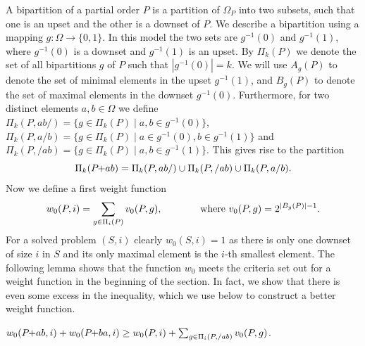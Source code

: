 \documentclass[a4paper,UKenglish,cleveref, autoref, thm-restate]{lipics-v2021}
\newcommand{\pchild}[3]{{#1}\kern-1pt{+}{#2}{#3}}
\begin{document}
A bipartition of a partial order $P$ is a partition of $\Omega_P$ into two subsets, such that one is an upset and the other is a downset of $P$.
We describe a bipartition using a mapping $g \colon \Omega \to \{0, 1\}$.
In this model the two sets are $g^{-1}(0)$ and $g^{-1}(1)$, where $g^{-1}(0)$ is a downset and $g^{-1}(1)$ is an upset.
By $\Pi_k(P)$ we denote the set of all bipartitions $g$ of $P$ such that $|g^{-1}(0)| = k$.
We will use $A_g(P)$ to denote the set of minimal elements in the upset $g^{-1}(1)$, and $B_g(P)$ to denote the set of maximal elements in the downset $g^{-1}(0)$.
Furthermore, for two distinct elements $a, b \in \Omega$ we define $\Pi_k(P,ab/) = \{g \in \Pi_k(P) \mid a,b \in g^{-1}(0)\}$, $\Pi_k(P,a/b) = \{g \in \Pi_k(P) \mid a \in g^{-1}(0), b \in g^{-1}(1)\}$ and $\Pi_k(P,/ab) = \{g \in \Pi_k(P) \mid a,b \in g^{-1}(1)\}$.
This gives rise to the partition 
\begin{equation}\label{eq:part_Pi}
    \Pi_k(\pchild{P}{a}{b}) = \Pi_k(P, ab/) \cup \Pi_k(P, /ab) \cup \Pi_k(P, a/b)\text{.}
\end{equation}
Now we define a first weight function
\begin{equation}\label{eq:def_w0}
    w_0(P, i) = \sum_{g \in \Pi_i(P)} v_0(P, g)\text{,} \quad\quad\quad\quad\text{where } v_0(P, g) = 2^{|B_g(P)| - 1}\text.
\end{equation}
For a solved problem $(S, i)$ clearly $w_0(S, i) = 1$ as there is only one downset of size $i$ in $S$ and its only maximal element is the $i$-th smallest element.
The following lemma shows that the function $w_0$ meets the criteria set out for a weight function in the beginning of the section.
In fact, we show that there is even some excess in the inequality, which we use below to construct a better weight function.
\begin{lemma}
  $w_0(\pchild{P}{a}{b}, i) + w_0(\pchild{P}{b}{a}, i) \geq w_0(P, i) + \sum_{g \in \Pi_i(P, /ab)} v_0(P, g)$.
\end{lemma}
\end{document}
